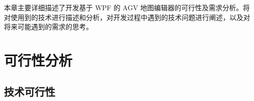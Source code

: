 
本章主要详细描述了开发基于 WPF 的 AGV 地图编辑器的可行性及需求分析。将对使用到的技术进行描述和分析，对开发过程中遇到的技术问题进行阐述，以及对将来可能遇到的需求的思考。

\section{可行性分析}

\subsection{技术可行性}


